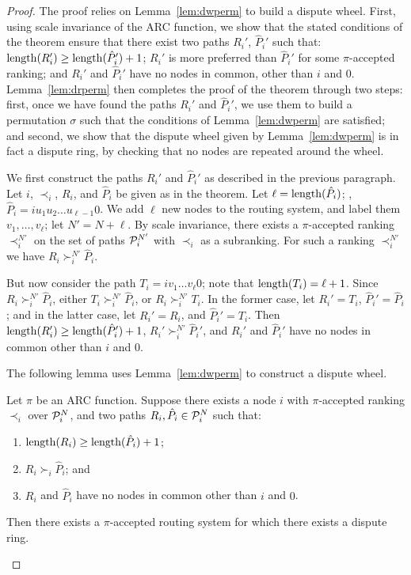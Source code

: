 \begin{proof}
The proof relies on Lemma~\ref{lem:dwperm} to build a
dispute wheel.  First, using scale invariance of the ARC function,
we show that the stated conditions of the theorem ensure that there
exist two paths $R_i'$, $\hat{P}_i'$ such that: $\length(R_i') \geq
\length(\hat{P}_i') + 1$; $R_i'$ is more preferred than $\hat{P}_i'$
for some $\pi$-accepted ranking; and $R_i'$ and
$\hat{P}_i'$ have no nodes in common, other than $i$ and $0$.
Lemma~\ref{lem:drperm} then completes the proof of the theorem through
two 
steps: first, once we have found the paths $R_i'$ and $\hat{P}_i'$, we
use them to build a permutation $\sigma$ such that the conditions of
Lemma~\ref{lem:dwperm} are satisfied; and second, we show that the
dispute wheel given by Lemma~\ref{lem:dwperm} is in fact a dispute
ring, by checking that no nodes are repeated around the wheel.

We first construct the paths $R_i'$ and $\hat{P}_i'$ as described in
the previous paragraph.  Let $i$, $\prec_i$, $R_i$, and $\hat{P}_i$ be
given as in the theorem.  Let $\ell = \length(\hat{P}_i)$; \ie,
$\hat{P}_i = i u_1 u_2 \ldots u_{\ell-1} 0$.  We add $\ell$ new nodes
to the routing system, and label them $v_1, \ldots, v_\ell$; let $N' =
N + \ell$.  By scale invariance, there exists a $\pi$-accepted
ranking $\prec_i^{N'}$ on the set of paths $\P_i^{N'}$
with $\prec_i$ as a subranking.  For such a ranking
$\prec_i^{N'}$ we have $R_i \succ_i^{N'} \hat{P}_i$.

But now consider the path $T_i = i v_1 \ldots v_\ell 0$; note that
$\length(T_i) = \ell+1$.  Since $R_i
\succ_i^{N'} \hat{P}_i$, either $T_i \succ_i^{N'} \hat{P}_i$, or $R_i
\succ_i^{N'} T_i$.  In the former case, let $R_i' = T_i$, $\hat{P}_i'
= \hat{P}_i$; and in the latter case, let $R_i' = R_i$, and
$\hat{P}_i' = T_i$.  Then $\length(R_i') \geq \length(\hat{P}_i') + 1$,
$R_i' \succ_i^{N'} \hat{P}_i'$, and $R_i'$ and $\hat{P}_i'$ have no
nodes in common other than $i$ and $0$.

The following lemma uses Lemma~\ref{lem:dwperm} to construct a dispute wheel.

\begin{lemma}
\label{lem:drperm}
Let $\pi$ be an ARC function.  Suppose there exists a node $i$
with $\pi$-accepted ranking $\prec_i$ over $\P_i^N$, and
two paths $R_i, \hat{P}_i
\in \P_i^N$ such that:
\begin{enumerate}
\itemsep=-1pt
\item $\length(R_i) \geq \length(\hat{P}_i) + 1$;\\
\item $R_i \succ_i \hat{P}_i$; and\\
\item $R_i$ and $\hat{P}_i$ have no nodes in common other than $i$ and
$0$.
\end{enumerate}
Then there exists a $\pi$-accepted routing system for which there exists a
dispute ring.
\end{lemma}


\end{proof}
